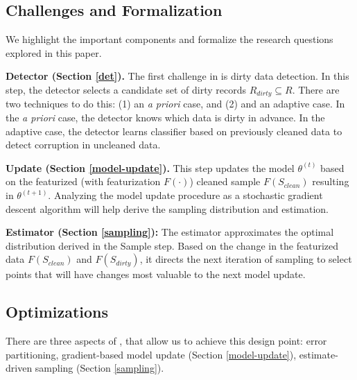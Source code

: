 \iffalse
\subsection{Challenges and Formalization}
We highlight the important components and formalize the research questions explored in this paper. 

\vspace{0.5em}

\noindent\textbf{Detector (Section \ref{det}). } The first challenge in \sys is dirty data detection. In this step, the detector selects a candidate set of dirty records $R_{dirty} \subseteq R$. There are two techniques to do this: (1) an \emph{a priori} case, and (2) and an adaptive case. In the \emph{a priori} case, the detector knows which data is dirty in advance. In the adaptive case, the detector learns classifier based on previously cleaned data to detect corruption in uncleaned data.

\vspace{0.5em}



\vspace{0.5em}



\vspace{0.5em}

\noindent\textbf{Update (Section \ref{model-update}). } This step updates the model $\theta^{(t)}$ based on the featurized (with featurization $F(\cdot)$) cleaned sample $F(S_{clean})$ resulting in $\theta^{(t+1)}$. Analyzing the model update procedure as a stochastic gradient descent algorithm will help derive the sampling distribution and estimation.

\vspace{0.5em}

\noindent\textbf{Estimator (Section \ref{sampling}): } The estimator approximates the optimal distribution derived in the Sample step. Based on the change in the featurized data $F(S_{clean})$ and $F(S_{dirty})$, it directs the next iteration of sampling to select points that will have changes most valuable to the next model update.


\subsection{Optimizations}
There are three aspects of \sys, that allow us to achieve this design point: error partitioning, gradient-based model update (Section \ref{model-update}), estimate-driven sampling (Section \ref{sampling}).

